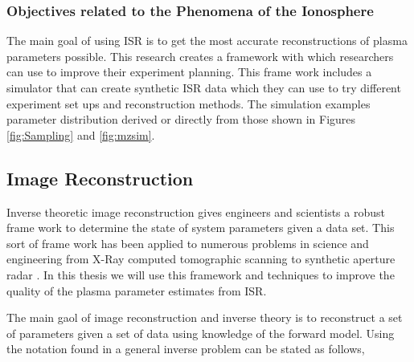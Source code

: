 %
\subsubsection{Objectives related to the Phenomena of the Ionosphere}
The main goal of using ISR is to get the most accurate reconstructions of plasma parameters possible. This research creates a framework with which researchers can use to improve their experiment planning. This frame work includes a simulator that can create synthetic ISR data which they can use to try different experiment set ups and reconstruction methods. The simulation examples parameter distribution derived or directly from those shown in Figures \ref{fig:Sampling} and \ref{fig:mzsim}.

\subsection{Image Reconstruction}
Inverse theoretic image reconstruction gives engineers and scientists a robust frame work to determine the state of system parameters given a data set. This sort of frame work has been applied to numerous problems in science and engineering from X-Ray computed tomographic scanning \cite{kak1988principles} to synthetic aperture radar \cite{1456966}. In this thesis we will use this framework and techniques to improve the quality of the plasma parameter estimates from ISR.

The main gaol of image reconstruction and inverse theory is to reconstruct a set of parameters given a set of data using knowledge of the forward model. Using the notation found in \cite{menke2012geophysical} a general inverse problem can be stated as follows,

